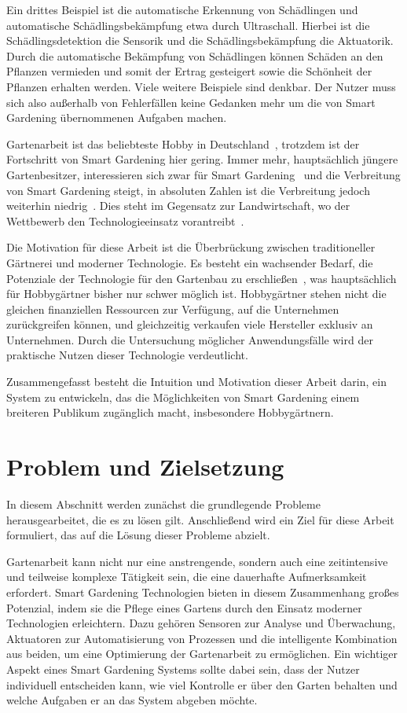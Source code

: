 Ein drittes Beispiel ist die automatische Erkennung von Schädlingen und automatische Schädlingsbekämpfung etwa durch Ultraschall.
Hierbei ist die Schädlingsdetektion die Sensorik und die Schädlingsbekämpfung die Aktuatorik.
Durch die automatische Bekämpfung von Schädlingen können Schäden an den Pflanzen vermieden und somit der Ertrag gesteigert sowie die Schönheit der Pflanzen erhalten werden.
Viele weitere Beispiele sind denkbar.
Der Nutzer muss sich also außerhalb von Fehlerfällen keine Gedanken mehr um die von Smart Gardening übernommenen Aufgaben machen.

Gartenarbeit ist das beliebteste Hobby in Deutschland~\cite{GartenHobby}, trotzdem ist der Fortschritt von Smart Gardening hier gering.
Immer mehr, hauptsächlich jüngere Gartenbesitzer, interessieren sich zwar für Smart Gardening~\cite{SmartGardeningBeliebt} und die Verbreitung von Smart Gardening steigt, in absoluten Zahlen ist die Verbreitung jedoch weiterhin niedrig~\cite{SmartGardeningBeliebt}.
Dies steht im Gegensatz zur Landwirtschaft, wo der Wettbewerb den Technologieeinsatz vorantreibt~\cite{IoTFarming}.

Die Motivation für diese Arbeit ist die Überbrückung zwischen traditioneller Gärtnerei und moderner Technologie.
Es besteht ein wachsender Bedarf, die Potenziale der Technologie für den Gartenbau zu erschließen~\cite{SmartGardeningBeliebt}, was hauptsächlich für Hobbygärtner bisher nur schwer möglich ist.
Hobbygärtner stehen nicht die gleichen finanziellen Ressourcen zur Verfügung, auf die Unternehmen zurückgreifen können, und gleichzeitig verkaufen viele Hersteller exklusiv an Unternehmen.
Durch die Untersuchung möglicher Anwendungsfälle wird der praktische Nutzen dieser Technologie verdeutlicht.

Zusammengefasst besteht die Intuition und Motivation dieser Arbeit darin, ein System zu entwickeln, das die Möglichkeiten von Smart Gardening einem breiteren Publikum zugänglich macht, insbesondere Hobbygärtnern.



\section{Problem und Zielsetzung}
In diesem Abschnitt werden zunächst die grundlegende Probleme herausgearbeitet, die es zu lösen gilt.
Anschließend wird ein Ziel für diese Arbeit formuliert, das auf die Lösung dieser Probleme abzielt.

Gartenarbeit kann nicht nur eine anstrengende, sondern auch eine zeitintensive und teilweise komplexe Tätigkeit sein, die eine dauerhafte Aufmerksamkeit erfordert.
Smart Gardening Technologien bieten in diesem Zusammenhang großes Potenzial, indem sie die Pflege eines Gartens durch den Einsatz moderner Technologien erleichtern.
Dazu gehören Sensoren zur Analyse und Überwachung, Aktuatoren zur Automatisierung von Prozessen und die intelligente Kombination aus beiden, um eine Optimierung der Gartenarbeit zu ermöglichen.
Ein wichtiger Aspekt eines Smart Gardening Systems sollte dabei sein, dass der Nutzer individuell entscheiden kann, wie viel Kontrolle er über den Garten behalten und welche Aufgaben er an das System abgeben möchte.

